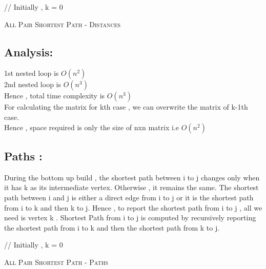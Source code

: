 \documentclass[11pt]{article}
\begin{document}
\pagebreak
\linesnumbered
\begin{algorithm}
// Initially , k = 0 \; 
\caption{\textsc{All Pair Shortest Path - Distances}}
\end{algorithm}

\subsection*{Analysis: }

1st nested loop is $O(n^2)$ \\
2nd nested loop is $O(n^3)$ \\
Hence , total time complexity is $O(n^3)$ \\

For calculating the matrix for kth case , we can overwrite the matrix of k-1th case. \\
Hence , space required is only the size of nxn matrix i.e $O(n^2)$


\subsection*{Paths :}

During the bottom up build , the shortest path between i to j changes only when it has k as its intermediate vertex.
Otherwise , it remains the same.
The shortest path between i and j is either a direct edge from i to j or it is the shortest path from i to k and then k to j.
Hence , to report the shortest path from i to j , all we need is vertex k .
Shortest Path from i to j is computed by recursively reporting the shortest path from i to k and then the shortest path from k to j. \\

\pagebreak
\linesnumbered
\begin{algorithm}
// Initially , k = 0 \; 


\caption{\textsc{All Pair Shortest Path - Paths}}
\end{algorithm}
\end{document}
